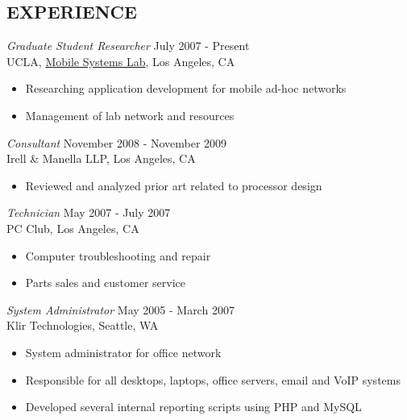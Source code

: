 \documentclass[margin]{res}
\begin{document}
\begin{resume}
\section{EXPERIENCE}

		{\sl Graduate Student Researcher} \hfill July 2007 - Present \\
                UCLA, \href{http://msl.cs.ucla.edu}{Mobile Systems Lab}, Los Angeles, CA
                 \begin{itemize}  \itemsep -2pt %
                \item Researching application development for mobile ad-hoc networks
		\item Management of lab network and resources
                \end{itemize}

		{\sl Consultant} \hfill November 2008 - November 2009 \\
		Irell \& Manella LLP, Los Angeles, CA
                 \begin{itemize}  \itemsep -2pt %
                \item Reviewed and analyzed prior art related to processor design
                \end{itemize}

		{\sl Technician} \hfill May 2007 - July 2007 \\
		PC Club, Los Angeles, CA
                 \begin{itemize}  \itemsep -2pt %
                \item Computer troubleshooting and repair
                \item Parts sales and customer service
                \end{itemize}

		{\sl System Administrator} \hfill May 2005 - March 2007 \\
                Klir Technologies, Seattle, WA 
                 \begin{itemize}  \itemsep -2pt %
                \item System administrator for office network
		\item Responsible for all desktops, laptops, office servers, email and VoIP systems
		\item Developed several internal reporting scripts using PHP and MySQL
                \end{itemize}


\end{resume}
\end{document}
